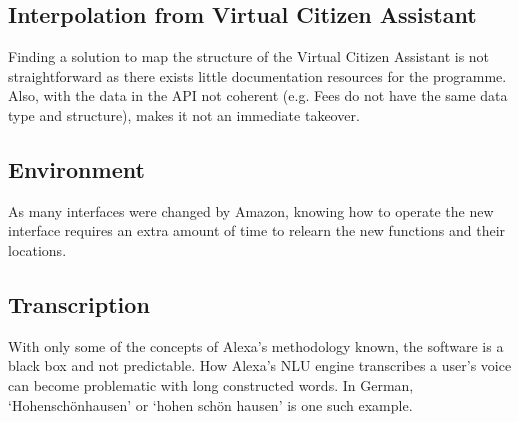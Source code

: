 \subsection*{Interpolation from Virtual Citizen Assistant}
Finding a solution to map the structure of the Virtual Citizen Assistant is not straightforward as there exists little documentation resources for the programme.
Also, with the data in the API not coherent (e.g. Fees do not have the same data type and structure), makes it not an immediate takeover.

\subsection*{Environment}
As many interfaces were changed by Amazon, knowing how to operate the new interface requires an extra amount of time to relearn the new functions and their locations.

\subsection*{Transcription}
With only some of the concepts of Alexa's methodology known, the software is a black box and not predictable. How Alexa's NLU engine transcribes a user's voice can become problematic with long constructed words. In German, `Hohenschönhausen' or `hohen schön hausen' is one such example.



%

